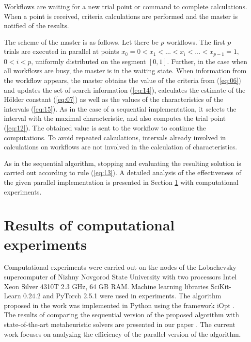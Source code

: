 \documentclass[runningheads]{llncs}
\begin{document}
Workflows are waiting for a new trial point or command to complete calculations. When a point is received, criteria calculations are performed and the master is notified of the results. 

The scheme of the master is as follows. Let there be $p$ workflows. The first $p$ trials are executed in parallel at points $x_0=0<x_1<\dots<x_i<\dots<x_{p-1}=1$, $0<i<p$, uniformly distributed on the segment $[0,1]$. Further, in the case when all workflows are busy, the master is in the waiting state. When information from the workflow appears, the master obtains the value of the criteria from (\ref{eq:06}) and updates the set of search information (\ref{eq:14}), calculates the estimate of the H{\" o}lder constant (\ref{eq:07}) as well as the values of the characteristics of the intervals (\ref{eq:15}). As in the case of a sequential implementation, it selects the interval with the maximal characteristic, and also computes the trial point (\ref{eq:12}). The obtained value is sent to the workflow to continue the computations. To avoid repeated calculations, intervals already involved in calculations on workflows are not involved in the calculation of characteristics.

As in the sequential algorithm, stopping and evaluating the resulting solution is carried out according to rule (\ref{eq:13}). A detailed analysis of the effectiveness of the given parallel implementation is presented in Section \ref{sec4} with computational experiments.


\section{Results of computational experiments}
\label{sec4}

Computational experiments were carried out on the nodes of the Lobachevsky supercomputer of Nizhny Novgorod State University with two processors Intel Xeon Silver 4310T 2.3 GHz, 64 GB RAM. Machine learning libraries SciKit-Learn 0.24.2 \cite{scikit-learn} and PyTorch 2.5.1 \cite{PyTorch} were used in experiments. The algorithm proposed in the work was implemented in Python using the framework iOpt \cite{ioptmco}. 
The results of comparing the sequential version of the proposed algorithm with state-of-the-art metaheuristic solvers are presented in our paper \cite{Konnov2025}. The current work focuses on analyzing the efficiency of the parallel version of the algorithm.
\end{document}
